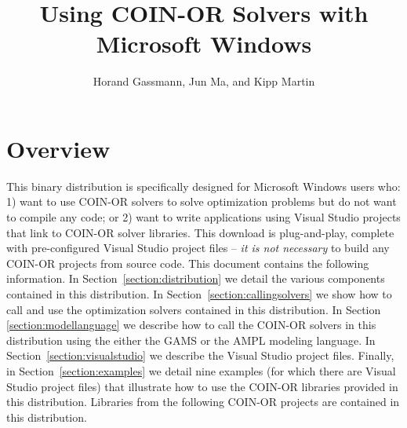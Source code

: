 \documentclass[11pt]{article}
\renewcommand{\{}{{\char"7B}}
\renewcommand{\}}{{\char"7D}}
\renewcommand{\^}{{\char"0D}}
\renewcommand{\'}{{\char"0D}}
\begin{document}
\title{Using COIN-OR Solvers with Microsoft Windows}
\vskip 2in
\author{Horand Gassmann, Jun Ma,  and  Kipp Martin}
\maketitle

\iffalse
\begin{abstract}
This document describes a special binary distribution of executables, libraries and code connected 
to the COIN-OR Optimization Services (OS) project. It is intended for users of Microsoft Windows who
want to use COIN-OR solvers to solve optimization problems without the need to compile any code or 
want to write applications using Visual Studio projects that link to COIN-OR solver libraries.  
We detail the use of these binaries with several examples and give code snippets for further insight. 
We also explain how the examples can be built in Microsoft Visual Studio 
using {\tt .vcproj} files that are provided as part of the distribution.

\end{abstract}

\newpage
\fi

\section{Overview}\label{section:overview}
This binary distribution is specifically designed for Microsoft Windows users who: 
1) want to use COIN-OR solvers to solve optimization problems but do not want to compile any code; 
or 2) want to write applications using Visual Studio projects that link to COIN-OR solver libraries.  
This download is plug-and-play, complete with pre-configured Visual Studio project 
files -- {\it it is not necessary} to build any COIN-OR projects from source code.  
This document contains the following information. In Section~\ref{section:distribution} we
detail the various components contained in this distribution. In Section~\ref{section:callingsolvers}  
we show how to call and use the optimization solvers contained in this distribution.  
In Section \ref{section:modellanguage} we describe how to call the COIN-OR solvers 
in this distribution using the either the GAMS or the AMPL modeling language. In Section~\ref{section:visualstudio} 
we describe the Visual Studio project files.  Finally, in Section~\ref{section:examples} 
we detail nine examples (for which there are Visual Studio project files) that illustrate 
how to use the COIN-OR libraries provided in this distribution.  Libraries from the following 
COIN-OR projects are contained in this distribution.
\end{document}
